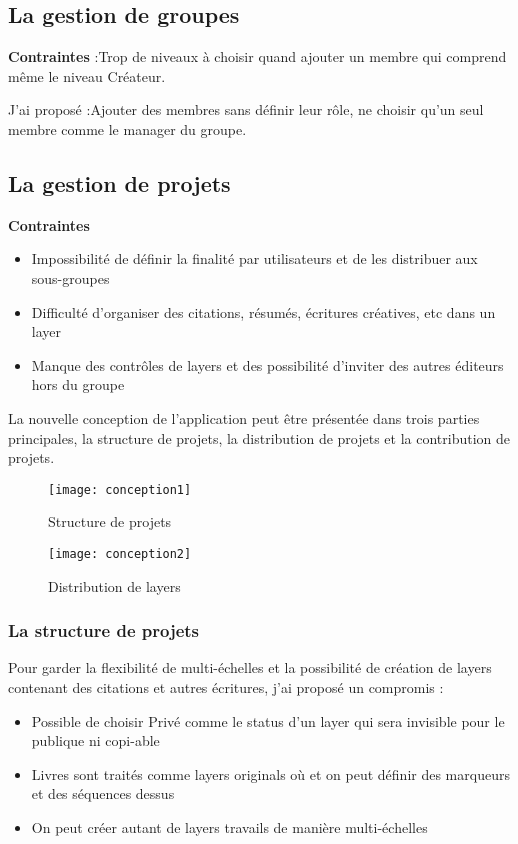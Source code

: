 \subsection{La gestion de groupes}

\textbf{Contraintes} :Trop de niveaux à choisir quand ajouter un membre qui comprend même le niveau Créateur.

J'ai proposé :Ajouter des membres sans définir leur rôle, ne choisir qu'un seul membre comme le manager du groupe.


\subsection{La gestion de projets}

\textbf{Contraintes}

\begin{itemize}
    \item Impossibilité de définir la finalité par utilisateurs et de les distribuer aux sous-groupes
    \item Difficulté d'organiser des citations, résumés, écritures créatives, etc dans un layer
    \item Manque des contrôles de layers et des possibilité d'inviter des autres éditeurs hors du groupe
\end{itemize}

La nouvelle conception de l'application peut être présentée dans trois parties principales, la structure de projets, la distribution de projets et la contribution de projets.

\begin{figure}[H]
\centering
\texttt{[image: conception1]}
\caption{Structure de projets}
\end{figure}

\begin{figure}[H]
\centering
\texttt{[image: conception2]}
\caption{Distribution de layers}
\end{figure}

\subsubsection{La structure de projets}

Pour garder la flexibilité de multi-échelles et la possibilité de création de layers contenant des citations et autres écritures, j'ai proposé un compromis :

\begin{itemize}
    \item Possible de choisir Privé comme le status d'un layer qui sera invisible pour le publique ni copi-able
    \item Livres sont traités comme layers originals où et on peut définir des marqueurs et des séquences dessus
    \item On peut créer autant de layers travails de manière multi-échelles 
\end{itemize}

